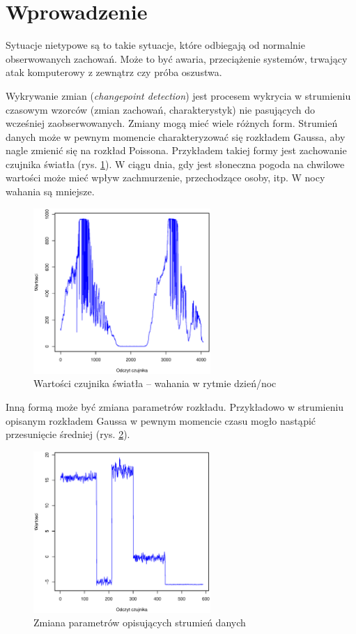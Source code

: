 \section{Wprowadzenie}

Sytuacje nietypowe są to takie sytuacje,
które odbiegają od normalnie obserwowanych zachowań.
Może to być awaria, przeciążenie systemów,
trwający atak komputerowy z zewnątrz czy próba oszustwa.

Wykrywanie zmian (\textit{changepoint detection}) jest procesem
wykrycia w strumieniu czasowym wzorców (zmian zachowań, charakterystyk) nie pasujących do wcześniej zaobserwowanych.
Zmiany mogą mieć wiele różnych form.
Strumień danych może w pewnym momencie charakteryzować się rozkładem Gaussa,
aby nagle zmienić się na rozkład Poissona.
Przykładem takiej formy jest zachowanie czujnika światła (rys. \ref{fig:SignalDevice}).
W ciągu dnia, gdy jest słoneczna pogoda na chwilowe wartości może mieć wpływ zachmurzenie, przechodzące osoby, itp.
W nocy wahania są mniejsze.
\begin{figure}[htbp]
\centering
	\includegraphics[width=0.6\textwidth]{img/ch-2-device}
	\caption{Wartości czujnika światła -- wahania w rytmie dzień/noc}
  \label{fig:SignalDevice}
\end{figure}
Inną formą może być zmiana parametrów rozkładu.
Przykładowo w strumieniu opisanym rozkładem Gaussa
w pewnym momencie czasu mogło nastąpić przesunięcie średniej (rys. \ref{fig:SignalData}).
\begin{figure}[htbp]
\centering
	\includegraphics[width=0.6\textwidth]{img/ch-2-data}
	\caption{Zmiana parametrów opisujących strumień danych}
  \label{fig:SignalData}
\end{figure}

